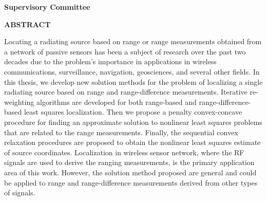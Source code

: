 \newpage
{}

\noindent \textbf{Supervisory Committee}
\tpbreak
\panel

\begin{center}
\textbf{ABSTRACT}
\end{center}


Locating a radiating source based on range or range measurements obtained from a network of passive sensors has been a subject of research over the past two decades due to the problem’s importance in applications in wireless communications, surveillance, navigation, geosciences, and several other fields. In this thesis, we develop  new solution methods for the problem of localizing a single radiating source based on range and range-difference measurements. Iterative re-weighting algorithms are developed for both range-based and range-difference-based least squares localization. Then we propose a penalty convex-concave procedure for finding an approximate solution to nonlinear least squares problems  that are related to the range measurements. Finally, the sequential convex relaxation procedures are proposed to obtain the nonlinear least squares estimate of source coordinates. Localization in wireless sensor network, where the RF signals are used to derive the ranging measurements,  is the primary application area of this work. However, the solution method proposed are general and could be applied to range and range-difference measurements derived from other types of signals. 